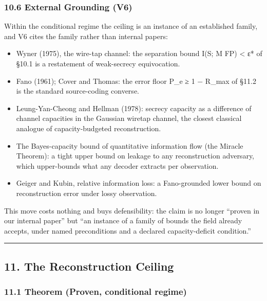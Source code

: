 \documentclass[
]{article}
\providecommand{\tightlist}{%
  \setlength{\itemsep}{0pt}\setlength{\parskip}{0pt}}
\begin{document}
\subsubsection{10.6 External Grounding
(V6)}\label{external-grounding-v6}

Within the conditional regime the ceiling is an instance of an
established family, and V6 cites the family rather than internal papers:

\begin{itemize}
\tightlist
\item
  Wyner (1975), the wire-tap channel: the separation bound I(S; M
  \textbar{} FP) \textless{} ε* of §10.1 is a restatement of
  weak-secrecy equivocation.
\item
  Fano (1961); Cover and Thomas: the error floor P\_e ≥ 1 − R\_max of
  §11.2 is the standard source-coding converse.
\item
  Leung-Yan-Cheong and Hellman (1978): secrecy capacity as a difference
  of channel capacities in the Gaussian wiretap channel, the closest
  classical analogue of capacity-budgeted reconstruction.
\item
  The Bayes-capacity bound of quantitative information flow (the Miracle
  Theorem): a tight upper bound on leakage to any reconstruction
  adversary, which upper-bounds what any decoder extracts per
  observation.
\item
  Geiger and Kubin, relative information loss: a Fano-grounded lower
  bound on reconstruction error under lossy observation.
\end{itemize}

This move costs nothing and buys defensibility: the claim is no longer
``proven in our internal paper'' but ``an instance of a family of bounds
the field already accepts, under named preconditions and a declared
capacity-deficit condition.''

\begin{center}\rule{0.5\linewidth}{0.5pt}\end{center}

\subsection{11. The Reconstruction
Ceiling}\label{the-reconstruction-ceiling}

\subsubsection{11.1 Theorem (Proven, conditional
regime)}\label{theorem-proven-conditional-regime}
\end{document}
